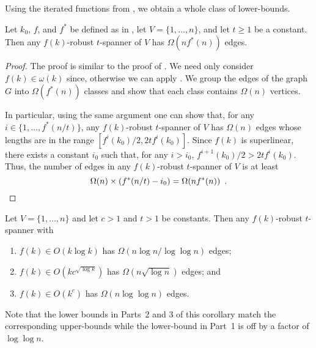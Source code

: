 \documentclass{patmorin}
\begin{document}
Using the iterated functions from , we obtain a whole
class of lower-bounds.

\begin{thm}
  Let $k_0$, $f$, and $f^*$ be defined as in ,
  let $V=\{1,\ldots,n\}$, and let $t\ge 1$ be a constant.  Then any
  $f(k)$-robust $t$-spanner of $V$ has $\Omega(nf^*(n))$ edges.
\end{thm}

\begin{proof}
  The proof is similar to the proof of .
  We need only consider $f(k)\in\omega(k)$ since, otherwise we can apply
  .  We group the edges of the graph
  $G$ into $\Omega(f^*(n))$ classes and show that each class contains
  $\Omega(n)$ vertices.  

  In particular, using the same argument one can show that, for
  any $i\in\{1,\ldots,f^*(n/t)\}$, any $f(k)$-robust $t$-spanner
  of $V$ has $\Omega(n)$ edges whose lengths are in the range
  $[f^i(k_0)/2,2tf^i(k_0)]$.  Since $f(k)$ is superlinear, there exists
  a constant $i_0$ such that, for any $i>i_0$, $f^{i+1}(k_0)/2 > 2tf^i(k_0)$.
  Thus, the number of edges in any $f(k)$-robust $t$-spanner of $V$ is at least
  \[  \Omega(n) \times (f^*(n/t)-i_0) = \Omega(n f^*(n)) \enspace . \qedhere \]
\end{proof}

\begin{cor}
  Let $V=\{1,\ldots,n\}$ and let $c>1$ and $t>1$ be constants.  Then any
  $f(k)$-robust $t$-spanner with
  \begin{enumerate}
    \item $f(k)\in O(k\log k)$ has $\Omega(n\log n/\log\log n)$ edges;
    \item $f(k)\in O(kc^{\sqrt{\log k}})$ has $\Omega(n\sqrt{\log n})$
      edges; and
    \item $f(k)\in O(k^{c})$ has $\Omega(n\log\log n)$ edges.
  \end{enumerate}
\end{cor}

Note that the lower bounds in Parts~2 and 3 of this corollary match the
corresponding upper-bounds while the lower-bound in Part~1 is off by a
factor of $\log\log n$.
\end{document}
